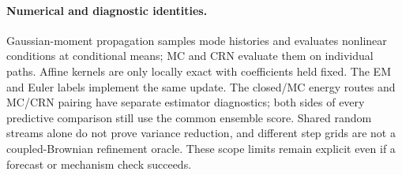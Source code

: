 \documentclass[11pt]{article}
\begin{document}
\paragraph{Numerical and diagnostic identities.}
Gaussian-moment propagation samples mode histories and evaluates nonlinear
conditions at conditional means; MC and CRN evaluate them on individual
paths. Affine kernels are only locally exact with coefficients held fixed.
The EM and Euler labels implement the same update. The closed/MC energy
routes and MC/CRN pairing have separate estimator diagnostics; both sides
of every predictive comparison still use the common ensemble score.
Shared random streams alone do not prove variance reduction, and different
step grids are not a coupled-Brownian refinement oracle. These scope limits
remain explicit even if a forecast or mechanism check succeeds.
\end{document}
